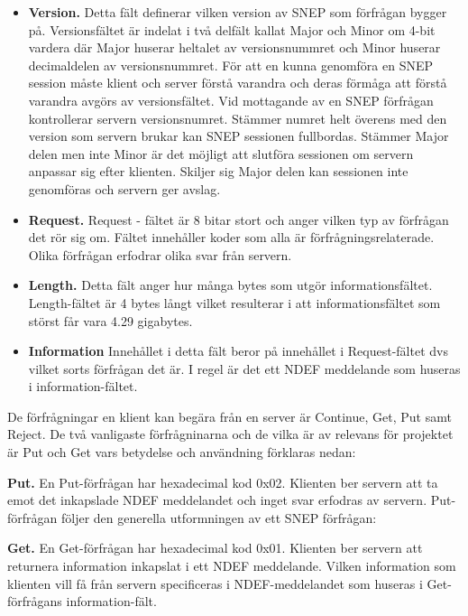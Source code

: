 \documentclass[11pt]{article}
\begin{document}
\begin{itemize}
\item \textbf{Version.} Detta fält definerar vilken version av SNEP som förfrågan bygger på. Versionsfältet är indelat i två delfält kallat Major och Minor om 4-bit vardera där Major huserar heltalet av versionsnummret och Minor huserar decimaldelen av versionsnummret. För att en kunna genomföra en SNEP session måste klient och server förstå varandra och deras förmåga att förstå varandra avgörs av versionsfältet. Vid mottagande av en SNEP förfrågan kontrollerar servern versionsnumret. Stämmer numret helt överens med den version som servern brukar kan SNEP sessionen fullbordas. Stämmer Major delen men inte Minor är det möjligt att slutföra sessionen om servern anpassar sig efter klienten. Skiljer sig Major delen kan sessionen inte genomföras och servern ger avslag.
\item \textbf{Request.} Request - fältet är 8 bitar stort och anger vilken typ av förfrågan det rör sig om. Fältet innehåller koder som alla är förfrågningsrelaterade. Olika förfrågan erfodrar olika svar från servern.
\item \textbf{Length.} Detta fält anger hur många bytes som utgör informationsfältet. Length-fältet är 4 bytes långt vilket resulterar i att informationsfältet som störst får vara 4.29 gigabytes.
\item \textbf{Information} Innehållet i detta fält beror på innehållet i Request-fältet dvs vilket sorts förfrågan det är. I regel är det ett NDEF meddelande som huseras i information-fältet.
\end{itemize}

De förfrågningar en klient kan begära från en server är Continue, Get, Put samt Reject. De två vanligaste förfrågninarna och de vilka är av relevans för projektet är Put och Get vars betydelse och användning förklaras nedan:

\textbf{Put.} En Put-förfrågan har hexadecimal kod 0x02. Klienten ber servern att ta emot det inkapslade NDEF meddelandet och inget svar erfodras av servern.  Put-förfrågan följer den generella utformningen av ett SNEP förfrågan:


\textbf{Get.} En Get-förfrågan har hexadecimal kod 0x01. Klienten ber servern att returnera information inkapslat i ett NDEF meddelande. Vilken information som klienten vill få från servern specificeras i NDEF-meddelandet som huseras i Get-förfrågans information-fält. 

\end{document}
